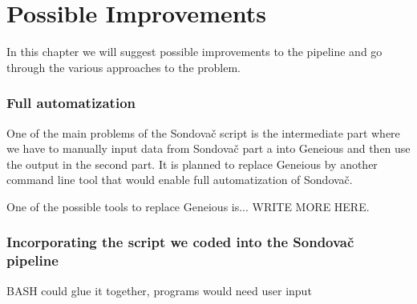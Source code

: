 \chapter[Possible Improvements]{Possible Improvements}
\label{kap:improvements}

In this chapter we will suggest possible improvements to the pipeline and go through the various approaches to the problem. 

\subsection{Full automatization}
One of the main problems of the Sondovač script is the intermediate part where we have to manually input data from Sondovač part a into Geneious and then use the output 
in the second part. 
It is planned to replace Geneious by another command line tool that would enable full automatization of Sondovač. 

One of the possible tools to replace Geneious is...
WRITE MORE HERE. 

\subsection{Incorporating the script we coded into the Sondovač pipeline}

BASH could glue it together, programs would need user input

